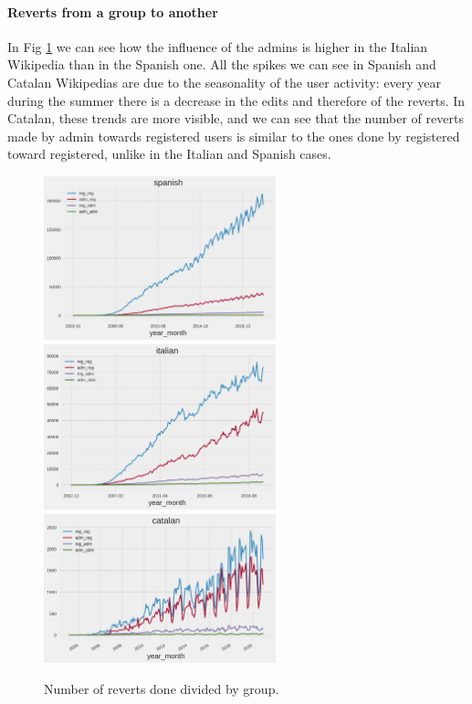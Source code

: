\paragraph*{Reverts from a group to another}
In Fig \ref{fig:compare} we can see how the influence of the admins is higher in the Italian
Wikipedia than in the Spanish one. All the spikes we can see in Spanish and Catalan Wikipedias are due to the
seasonality of the user activity: every year during the summer there is a decrease in the edits and
therefore of the reverts. In Catalan, these trends are more visible, and we can see that the number of
reverts made by admin towards registered users is similar to the ones done by registered toward
registered, unlike in the Italian and Spanish cases. 
\begin{figure}[H]
    \centering
    \includegraphics[width=0.6\textwidth]{./chapters/04/assets/admin_es.png}
    \includegraphics[width=0.6\textwidth]{./chapters/04/assets/admin_it.png}
    \includegraphics[width=0.6\textwidth]{./chapters/04/assets/admin_ca.png}
    \caption{Number of reverts done divided by group.}
    \label{fig:compare}
\end{figure}



